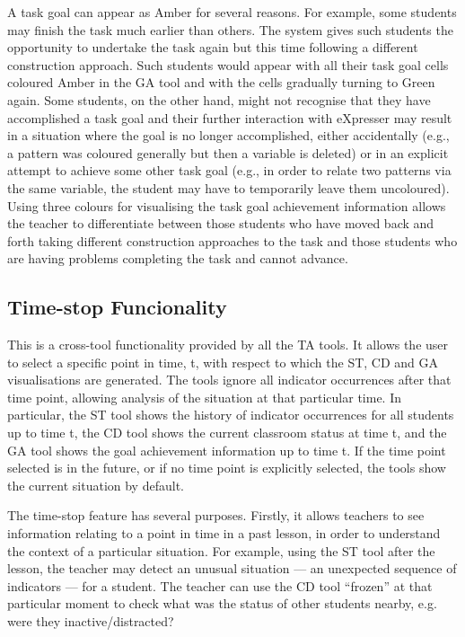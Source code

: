 A task goal can appear as Amber for several reasons. For example, some
students may finish the task much earlier than others. The system
gives such students the opportunity to undertake the task again but
this time following a different construction approach. Such students
would appear with all their task goal cells coloured Amber in the GA
tool and with the cells gradually turning to Green again. Some
students, on the other hand, might not recognise that they have
accomplished a task goal and their further interaction with eXpresser
may result in a situation where the goal is no longer accomplished,
either accidentally (e.g., a pattern was coloured generally but then a
variable is deleted) or in an explicit attempt to achieve some other
task goal (e.g., in order to relate two patterns via the same
variable, the student may have to temporarily leave them
uncoloured). Using three colours for visualising the task goal
achievement information allows the teacher to differentiate between
those students who have moved back and forth taking different
construction approaches to the task and those students who are having
problems completing the task and cannot advance.


\subsection{Time-stop Funcionality}
\label{sec:time-stop-func}

This is a cross-tool functionality provided by all the TA tools. It
allows the user to select a specific point in time, t, with respect to
which the ST, CD and GA visualisations are generated. The tools ignore
all indicator occurrences after that time point, allowing analysis of
the situation at that particular time. In particular, the ST tool
shows the history of indicator occurrences for all students up to time
t, the CD tool shows the current classroom status at time t, and the
GA tool shows the goal achievement information up to time t.  If the
time point selected is in the future, or if no time point is
explicitly selected, the tools show the current situation by default.
 
The time-stop feature has several purposes. Firstly, it allows
teachers to see information relating to a point in time in a past
lesson, in order to understand the context of a particular
situation. For example, using the ST tool after the lesson, the
teacher may detect an unusual situation --- an unexpected sequence of
indicators --- for a student. The teacher can use the CD tool “frozen”
at that particular moment to check what was the status of other
students nearby, e.g. were they inactive/distracted?
 

